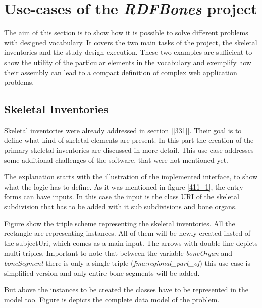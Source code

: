 

\section{Use-cases of the \textit{RDFBones} project}

The aim of this section is to show how it is possible to solve different problems with designed vocabulary. It covers the two main tasks of the project, the skeletal inventories and the study design execution. These two examples are sufficient to show the utility of the particular elements in the vocabulary and exemplify how their assembly can lead to a compact definition of complex web application problems.


\subsection{Skeletal Inventories}

Skeletal inventories were already addressed in section \ref{[331]}. Their goal is to define what kind of skeletal elements are present. In this part the creation of the primary skeletal inventories are discussed in more detail. This use-case addresses some additional challenges of the software, that were not mentioned yet.

The explanation starts with the illustration of the implemented interface, to show what the logic has to define. As it was mentioned in figure \ref{411_1}, the entry forms can have inputs. In this case the input is the class URI of the skeletal subdivision that has to be added with it sub subdivisions and bone organs.




Figure  show the triple scheme representing the skeletal inventories. All the rectangle are representing instances. All of them will be newly created insted of the subjectUri, which comes as a main input. The arrows with double line depicts multi triples. Important to note that between the variable \textit{boneOrgan} and \textit{boneSegment} there is only a single triple (\textit{fma:regional\_part\_of}) this use-case is simplified version and only entire bone segments will be added.



But above the instances to be created the classes have to be represented in the model too. Figure  is depicts the complete data model of the problem.

